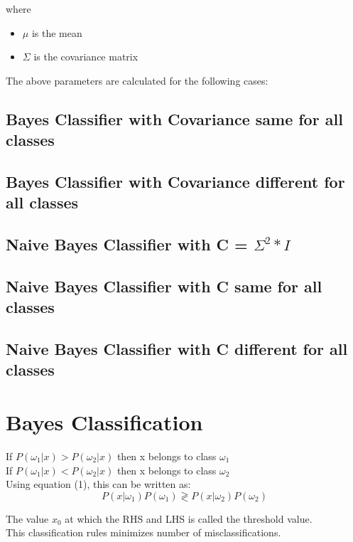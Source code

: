 \documentclass[11pt,a4paper]{article}
\begin{document}
 where
 \begin{itemize}
 	\item $\mu$ is the mean 
 	\item $\Sigma$ is the covariance matrix
 \end{itemize}
 
 The above parameters are calculated for the following cases:
 \subsection{Bayes Classifier with Covariance same for all classes}
 \subsection{Bayes Classifier with Covariance different for all classes}
 \subsection{Naive Bayes Classifier with C = $\Sigma^2*I$}
 \subsection{Naive Bayes Classifier with C same for all classes}
 \subsection{Naive Bayes Classifier with C different for all classes} 

\section{Bayes Classification}

If $P(\omega_1 | x) > P(\omega_2 | x)$ then x belongs to class $\omega_1$
\\If $P(\omega_1 | x) < P(\omega_2 | x)$ then x belongs to class $\omega_2$\\

Using equation (1), this can be written as:
 \begin{equation}
 {P(x| \omega_1)P(\omega_1) \gtrless P(x | \omega_2)P(\omega_2)}
 \end{equation}

 The value $x_0$ at which the RHS and LHS is called the threshold value. \\

This classification rules minimizes number of misclassifications. \\ \\ 
\end{document}
